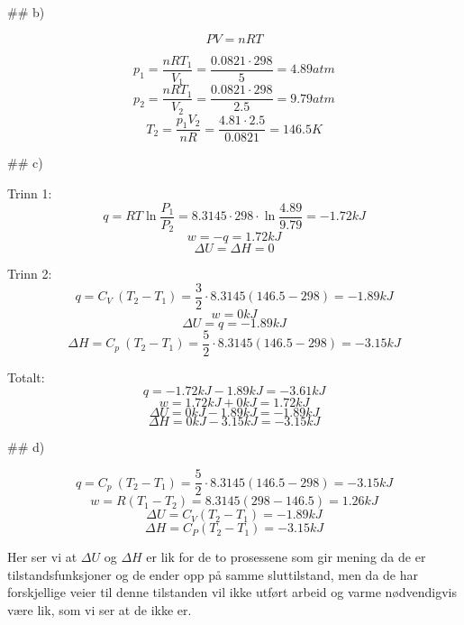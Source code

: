 ## b)

$$ P V = n R T $$

$$ p_1 = \frac{n R T_1}{V_1} = \frac{0.0821 \cdot 298}{5} = 4.89 atm $$
$$ p_2 = \frac{n R T_1}{V_2} = \frac{0.0821 \cdot 298}{2.5} = 9.79 atm $$
$$ T_2 = \frac{p_1 V_2}{n R} = \frac{4.81 \cdot 2.5}{0.0821} = 146.5 K $$

## c)

Trinn 1:
\
$$
q = R T \ln{\frac{P_1}{P_2}} = 8.3145 \cdot 298 \cdot \ln{\frac{4.89}{9.79}}
= -1.72 kJ
$$
$$ w = -q = 1.72 kJ $$
$$ \Delta U = \Delta H = 0 $$

Trinn 2:
\
$$ q = C_V\ (T_2 - T_1) = \frac{3}{2} \cdot 8.3145 (146.5 - 298) = -1.89 kJ $$
$$ w = 0 kJ $$
$$
\Delta U = q = -1.89 kJ
$$
$$
\Delta H = C_p\ (T_2 - T_1) = \frac{5}{2} \cdot 8.3145 (146.5 - 298) = -3.15 kJ
$$

Totalt:
\
$$ q = -1.72 kJ - 1.89 kJ = - 3.61 kJ $$
$$ w = 1.72 kJ + 0 kJ = 1.72 kJ $$
$$ \Delta U = 0 kJ - 1.89 kJ = -1.89 kJ $$
$$ \Delta H = 0 kJ - 3.15 kJ = -3.15 kJ $$

## d)

$$ q = C_p\ (T_2 - T_1) = \frac{5}{2} \cdot 8.3145 (146.5 - 298) = -3.15 kJ $$
$$ w = R (T_1 - T_2) = 8.3145 (298 - 146.5) = 1.26 kJ $$
$$ \Delta U = C_V (T_2 - T_1) = -1.89 kJ $$
$$ \Delta H = C_P (T_2 - T_1) = -3.15 kJ $$

Her ser vi at $\Delta U$ og $\Delta H$ er lik for de to prosessene som gir mening da de er tilstandsfunksjoner og de ender opp på samme sluttilstand, men da de har forskjellige veier til denne tilstanden vil ikke utført arbeid og varme nødvendigvis være lik, som vi ser at de ikke er.
